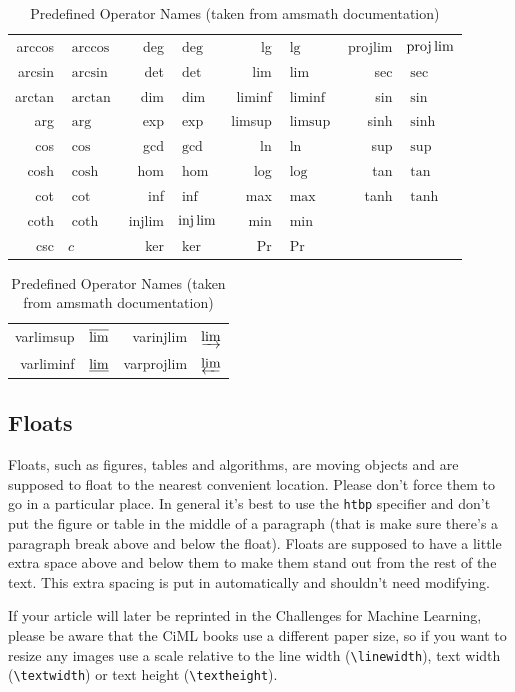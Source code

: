 \documentclass{article}
\begin{document}
\begin{table}[htbp]
  \label{table:operatornames}%
  {\caption{Predefined Operator Names (taken from 
   \textsf{amsmath} documentation)}}%
  {%
\begin{tabular}{rlrlrlrl}
arccos & $\arccos$ &  deg & $\deg$ &  lg & $\lg$ &  projlim & $\projlim$ \\
{arcsin} & $\arcsin$ &  {det} & $\det$ &  {lim} & $\lim$ &  {sec} & $\sec$ \\
{arctan} & $\arctan$ &  {dim} & $\dim$ &  {liminf} & $\liminf$ &  {sin} & $\sin$ \\
{arg} & $\arg$ &  {exp} & $\exp$ &  {limsup} & $\limsup$ &  {sinh} & $\sinh$ \\
{cos} & $\cos$ &  {gcd} & $\gcd$ &  {ln} & $\ln$ &  {sup} & $\sup$ \\
{cosh} & $\cosh$ &  {hom} & $\hom$ &  {log} & $\log$ &  {tan} & $\tan$ \\
{cot} & $\cot$ &  {inf} & $\inf$ &  {max} & $\max$ &  {tanh} & $\tanh$ \\
{coth} & $\coth$ &  {injlim} & $\injlim$ &  {min} & $\min$ \\
{csc} & $c$ &  {ker} & $\ker$ &  {Pr} & $\Pr$
\end{tabular}\par
\begin{tabular}{rlrl}
{varlimsup} & $\varlimsup$ 
& {varinjlim} & $\varinjlim$\\
{varliminf} & $\varliminf$ 
& {varprojlim} & $\varprojlim$
\end{tabular}
}
\end{table}

\subsection{Floats}
\label{sec:floats}

Floats, such as figures, tables and algorithms, are moving
objects and are supposed to float to the nearest convenient
location. Please don't force them to go in a particular place. In
general it's best to use the \texttt{htbp} specifier and don't
put the figure or table in the middle of a paragraph (that is
make sure there's a paragraph break above and below the float).
Floats are supposed to have a little extra space above and below
them to make them stand out from the rest of the text. This extra
spacing is put in automatically and shouldn't need modifying.

If your article will later be reprinted in the Challenges for
Machine Learning, please be aware that the CiML books use a
different paper size, so if you want to resize any images use a
scale relative to the line width (\verb|\linewidth|), text width
(\verb|\textwidth|) or text height (\verb|\textheight|).
\end{document}
